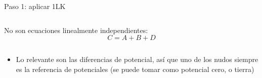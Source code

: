\documentclass[aspectratio=169, xcolor={usenames,svgnames,dvipsnames}]{beamer}
\begin{document}
\begin{frame}{Paso 1: \hspace{3mm}aplicar 1LK}
\begin{columns}
\begin{column}{0.53\columnwidth}
    \vspace{10pt}
    
    No son ecuaciones linealmente independientes:
    \begin{equation*}
      C = A + B + D
    \end{equation*}
    \end{column}
    \end{columns}
    
    \vspace{5pt}   
    
    \begin{center}
    \end{center}
    \vspace{-10pt} 
    \begin{itemize}\addtolength{\itemindent}{7mm}
        \item Lo relevante son las \alert{diferencias de potencial}, así que uno de los nudos siempre \hspace*{7mm}es la referencia de potenciales (se puede tomar como potencial cero, o tierra)
    \end{itemize}
\end{frame}

\end{document}
